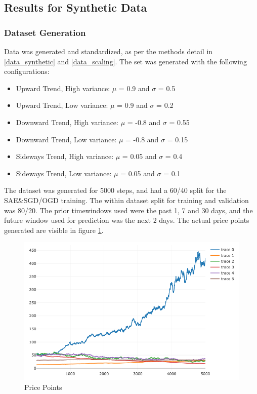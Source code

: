 \documentclass[a4paper,latin]{paper}
\begin{document}
\subsection{Results for Synthetic Data}

\subsubsection{Dataset Generation}

Data was generated and standardized, as per the methods detail in \ref{data_synthetic} and \ref{data_scaling}. The set was generated with the following configurations:
\begin{itemize}
	\item Upward Trend, High variance: $\mu$ = 0.9 and $\sigma$ = 0.5
	\item Upward Trend, Low variance:  $\mu$ = 0.9 and $\sigma$ = 0.2
	\item Downward Trend, High variance:  $\mu$ = -0.8 and $\sigma$ = 0.55
	\item Downward Trend, Low variance:  $\mu$ = -0.8 and $\sigma$ = 0.15
	\item Sideways Trend, High variance:  $\mu$ = 0.05 and $\sigma$ = 0.4
	\item Sideways Trend, Low variance:  $\mu$ = 0.05 and $\sigma$ = 0.1			
\end{itemize}

The dataset was generated for 5000 steps, and had a 60/40 split for the SAE\&SGD/OGD training. The within dataset split for training and validation was 80/20. The prior timewindows used were the past 1, 7 and 30 days, and the future window used for prediction was the next 2 days. The actual price points generated are visible in figure \ref{figure-synthetic-prices}.

\begin{figure}[H]
	\centering \includegraphics[scale=0.5]{images/synthetic_results/priceplot.png}
	\caption{Price Points}
	\label{figure-synthetic-prices}
\end{figure}
\end{document}
